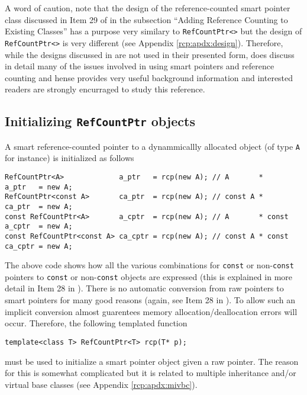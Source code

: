 A word of caution, note that the design of the reference-counted smart
pointer class discussed in Item 29 of {}\cite{ref:meyers_1996} in the
subsection ``Adding Reference Counting to Existing Classes'' has a
purpose very similary to {}\texttt{RefCountPtr<>} but the design of
{}\texttt{RefCountPtr<>} is very different (see Appendix
{}\ref{rcp:apdx:design}).  Therefore, while the designs discussed in
{}\cite{ref:meyers_1996} are not used in their presented form,
{}\cite{ref:meyers_1996} does discuss in detail many of the issues
involved in using smart pointers and reference counting and hense
provides very useful background information and interested readers are
strongly encurraged to study this reference.

%
\subsection{Initializing {}\texttt{RefCountPtr} objects}
\label{rcp:sec:init-rcp-objects}
%

A smart reference-counted pointer to a dynammicallly allocated object
(of type {}\texttt{A} for instance) is initialized as follows
%
{\scriptsize\begin{verbatim}
RefCountPtr<A>             a_ptr   = rcp(new A); // A       *       a_ptr   = new A;
RefCountPtr<const A>       ca_ptr  = rcp(new A); // const A *       ca_ptr  = new A;
const RefCountPtr<A>       a_cptr  = rcp(new A); // A       * const a_cptr  = new A;
const RefCountPtr<const A> ca_cptr = rcp(new A); // const A * const ca_cptr = new A;
\end{verbatim}}
%
The above code shows how all the various combinations for
{}\texttt{const} or non-{}\texttt{const} pointers to {}\texttt{const}
or non-{}\texttt{const} objects are expressed (this is explained in
more detail in Item 28 in {}\cite{ref:meyers_1996}).  There is no
automatic conversion from raw pointers to smart pointers for many good
reasons (again, see Item 28 in {}\cite{ref:meyers_1996}).  To allow such
an implicit conversion almost guarentees memory
allocation/deallocation errors will occur.  Therefore, the following
templated function
%
{\scriptsize\begin{verbatim}
template<class T> RefCountPtr<T> rcp(T* p);
\end{verbatim}}
%
\noindent{}
must be used to initialize a smart pointer object given a raw pointer.
The reason for this is somewhat complicated but it is related to
multiple inheritance and/or virtual base classes (see Appendix
{}\ref{rcp:apdx:mivbc}).

